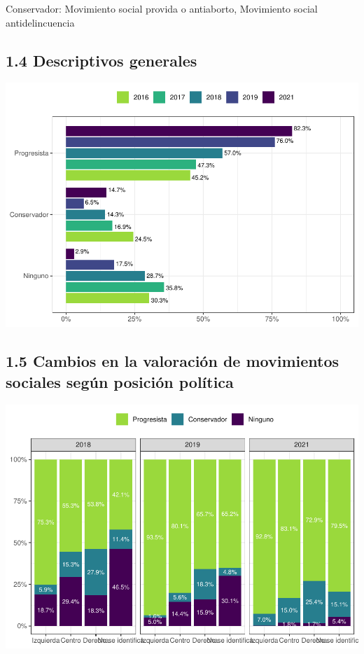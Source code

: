 \documentclass[
  12pt,
]{book}
\begin{document}
Conservador: Movimiento social provida o antiaborto, Movimiento social antidelincuencia

\hypertarget{descriptivos-generales}{%
\subsection{1.4 Descriptivos generales}\label{descriptivos-generales}}

\includegraphics{reporte-elsoc_files/figure-latex/unnamed-chunk-9-1.pdf}

\hypertarget{cambios-en-la-valoraciuxf3n-de-movimientos-sociales-seguxfan-posiciuxf3n-poluxedtica}{%
\subsection{1.5 Cambios en la valoración de movimientos sociales según posición política}\label{cambios-en-la-valoraciuxf3n-de-movimientos-sociales-seguxfan-posiciuxf3n-poluxedtica}}

\includegraphics{reporte-elsoc_files/figure-latex/unnamed-chunk-10-1.pdf}
\end{document}
